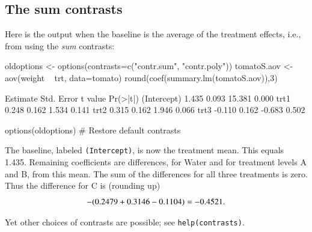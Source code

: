 \documentclass{tufte-book}\usepackage[]{graphicx}\usepackage[]{color}
\newcommand{\txtt}[1]{\texttt{#1}}
\begin{document}
\subsection*{The sum contrasts}

Here is the output when the baseline is the average of
the treatment effects, i.e., from using the \textit{sum} contrasts:
\begin{Schunk}
\begin{Sinput}
oldoptions <- options(contrasts=c("contr.sum",
                                  "contr.poly"))
tomatoS.aov <- aov(weight ~ trt, data=tomato)
round(coef(summary.lm(tomatoS.aov)),3)
\end{Sinput}
\begin{Soutput}
            Estimate Std. Error t value Pr(>|t|)
(Intercept)    1.435      0.093  15.381    0.000
trt1           0.248      0.162   1.534    0.141
trt2           0.315      0.162   1.946    0.066
trt3          -0.110      0.162  -0.683    0.502
\end{Soutput}
\begin{Sinput}
options(oldoptions)  # Restore default contrasts
\end{Sinput}
\end{Schunk}
{}
The baseline, labeled \verb!(Intercept)!, is now
the treatment mean.  This equals 1.435. Remaining coefficients are
differences, for Water and for treatment levels A and B, from this
mean.  The sum of the differences for all three treatments is zero.
Thus the difference for C is (rounding up) \vspace*{-2pt}
\[
-(0.2479+ 0.3146-0.1104) = -0.4521 .\vspace*{-2pt}\]

Yet other choices of contrasts are possible; see
\txtt{help(contrasts)}.
\end{document}
